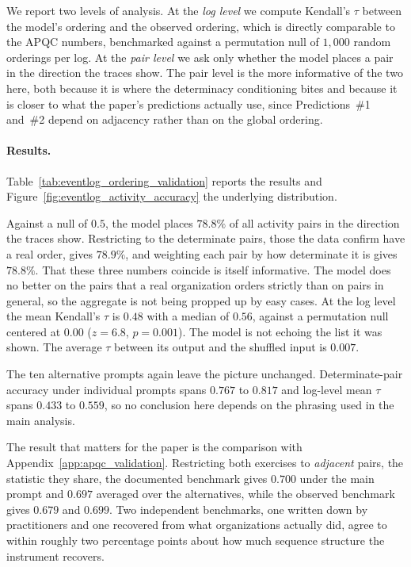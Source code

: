 We report two levels of analysis.
At the \emph{log level} we compute Kendall's $\tau$ between the model's ordering and the observed ordering, which is directly comparable to the APQC numbers, benchmarked against a permutation null of $1{,}000$ random orderings per log.
At the \emph{pair level} we ask only whether the model places a pair in the direction the traces show.
The pair level is the more informative of the two here, both because it is where the determinacy conditioning bites and because it is closer to what the paper's predictions actually use, since Predictions~\#1 and~\#2 depend on adjacency rather than on the global ordering.

\paragraph{Results.}
\label{app:eventlog_results}
Table~\ref{tab:eventlog_ordering_validation} reports the results and Figure~\ref{fig:eventlog_activity_accuracy} the underlying distribution.

Against a null of $0.5$, the model places $78.8\%$ of all activity pairs in the direction the traces show.
Restricting to the determinate pairs, those the data confirm have a real order, gives $78.9\%$, and weighting each pair by how determinate it is gives $78.8\%$.
That these three numbers coincide is itself informative. The model does no better on the pairs that a real organization orders strictly than on pairs in general, so the aggregate is not being propped up by easy cases.
At the log level the mean Kendall's $\tau$ is $0.48$ with a median of $0.56$, against a permutation null centered at $0.00$ ($z = 6.8$, $p = 0.001$).
The model is not echoing the list it was shown. The average $\tau$ between its output and the shuffled input is $0.007$.

The ten alternative prompts again leave the picture unchanged.
Determinate-pair accuracy under individual prompts spans $0.767$ to $0.817$ and log-level mean $\tau$ spans $0.433$ to $0.559$, so no conclusion here depends on the phrasing used in the main analysis.

The result that matters for the paper is the comparison with Appendix~\ref{app:apqc_validation}.
Restricting both exercises to \emph{adjacent} pairs, the statistic they share, the documented benchmark gives $0.700$ under the main prompt and $0.697$ averaged over the alternatives, while the observed benchmark gives $0.679$ and $0.699$.
Two independent benchmarks, one written down by practitioners and one recovered from what organizations actually did, agree to within roughly two percentage points about how much sequence structure the instrument recovers.

